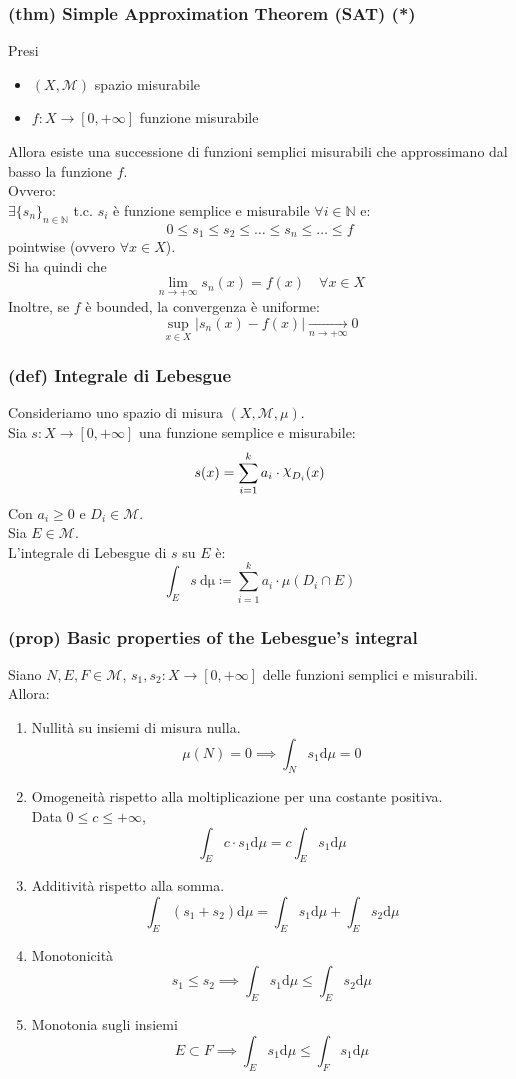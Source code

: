 \subsubsection{(thm) Simple Approximation Theorem (SAT) (*)}
Presi
\begin{itemize}
    \item $(X,\mathcal M)$ spazio misurabile
    \item $f:X\to [0,+\infty]$ funzione misurabile
\end{itemize}
Allora esiste una successione di funzioni semplici misurabili che approssimano dal basso la funzione $f$.
\\ Ovvero:\\
$\exists \{s_n\}_{n\in \mathbb N}$ t.c. $s_i$ è funzione semplice e misurabile $\forall i\in \mathbb N$ e:
$$0\le s_1\le s_2\le \dots \le s_n\le \dots \le f$$ pointwise (ovvero $\forall x \in X$).\\
Si ha quindi che 
$$\lim_{n\to +\infty} s_n(x)=f(x) \quad \forall x\in X$$
Inoltre, se $f$ è bounded, la convergenza è uniforme:
$$\sup_{x\in X}\vert s_n(x)-f(x)\vert \xrightarrow[n\to +\infty]{} 0$$
\subsubsection{(def) Integrale di Lebesgue}
Consideriamo uno spazio di misura $(X,\mathcal M, \mu)$.\\
Sia $s:X\to [0,+\infty]$ una funzione semplice e misurabile:
$$s(x)=\sum_{i=1}^k a_i\cdot \rchi_{D_i}(x)$$
Con $a_i\ge 0$ e $D_i\in \mathcal M$.\\
Sia $E\in \mathcal M$.\\
L'integrale di Lebesgue di $s$ su $E$ è:
$$\int_{E}s\ \mathrm{d\mu}\coloneqq\sum_{i=1}^k a_i\cdot\mu(D_i\cap E)$$

\subsubsection{(prop) Basic properties of the Lebesgue's integral}
Siano $N,E,F\in \mathcal M$, $s_1,s_2:X\to [0,+\infty]$ delle funzioni semplici e misurabili.\\
Allora:\\
\begin{enumerate}
    \item Nullità su insiemi di misura nulla.\\$$\mu(N)=0\implies \int_Ns_1\mathrm{d}\mu=0$$
    \item Omogeneità rispetto alla moltiplicazione per una costante positiva. \\ Data $0\le c\le +\infty $, $$\int_E c\cdot s_1\mathrm{d}\mu=c\int_E s_1\mathrm{d}\mu$$
    \item Additività rispetto alla somma.
    $$\int_E(s_1+s_2)\mathrm{d}\mu=\int_Es_1\mathrm{d}\mu+\int_Es_2\mathrm{d}\mu$$
    \item Monotonicità$$s_1\le s_2\implies \int_Es_1\mathrm{d}\mu\le\int_Es_2\mathrm{d}\mu$$
    \item Monotonia sugli insiemi$$E\subset F\implies \int_Es_1\mathrm{d}\mu\le\int_Fs_1\mathrm d\mu$$ 
\end{enumerate}
